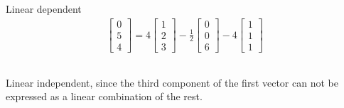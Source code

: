 \documentclass{article}
\theoremstyle{definition} %
\begin{document}
\subsection{}
Linear dependent
\begin{align*}
    \begin{bmatrix}
        0\\5\\4
    \end{bmatrix}
    =
    4
    \begin{bmatrix}
        1\\2\\3    
    \end{bmatrix}
    - \frac{1}{2}
    \begin{bmatrix}
        0\\0\\6
    \end{bmatrix}
    - 4
    \begin{bmatrix}
        1\\1\\1   
    \end{bmatrix}
\end{align*}

\subsection{}
Linear independent, since the third component of the first vector can not be expressed as a linear combination of the rest.
\end{document}
